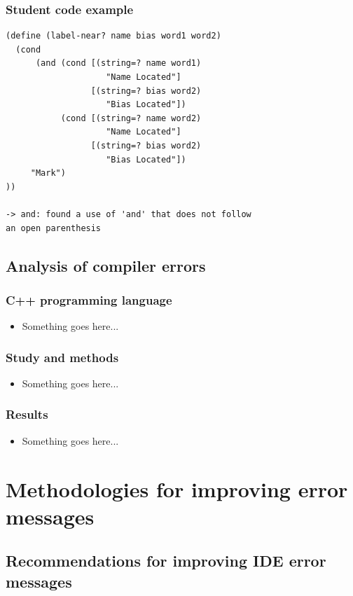 \documentclass{beamer}
\begin{document}
\begin{frame}[fragile]
 \frametitle{Student code example}
 			\begin{verbatim}
(define (label-near? name bias word1 word2)
  (cond
      (and (cond [(string=? name word1) 
                    "Name Located"]
                 [(string=? bias word2)
                    "Bias Located"])
           (cond [(string=? name word2)
                    "Name Located"]
                 [(string=? bias word2) 
                    "Bias Located"])
     "Mark")
))

-> and: found a use of 'and' that does not follow 
an open parenthesis
			\end{verbatim}
\end{frame}

\subsection[Compiler Analysis]{Analysis of compiler errors}

\begin{frame}
	\frametitle{C++ programming language}
		\begin{itemize}
			\item Something goes here...
		\end{itemize}

\end{frame}

\begin{frame}
	\frametitle{Study and methods}
		\begin{itemize}
			\item Something goes here...
		\end{itemize}

\end{frame}

\begin{frame}
	\frametitle{Results}
		\begin{itemize}
			\item Something goes here...
		\end{itemize}

\end{frame}

\section[Methodologies]{Methodologies for improving error messages}

\subsection[DrRacket recommendations]{Recommendations for improving IDE error messages}
\end{document}

